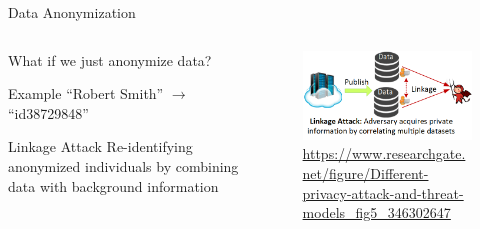 \documentclass[12pt,aspectratio=169]{beamer}
\begin{document}
\begin{frame}{Data Anonymization}

  \begin{columns}[T]
    \begin{column}{.5\textwidth}
What if we just anonymize data?

\vspace{3mm}

\begin{block}{Example}
``Robert Smith'' $\rightarrow$ ``id38729848''
\end{block}

\begin{block}{Linkage Attack}
Re-identifying anonymized individuals by combining data with background information
\end{block}

    \end{column}
    \begin{column}{.5\textwidth}

\begin{figure}
    \centering
    \includegraphics[width=\linewidth]{figures/Different-privacy-attack-and-threat-models.png}
    \caption{\tiny \url{https://www.researchgate.net/figure/Different-privacy-attack-and-threat-models_fig5_346302647}}
\end{figure}

    \end{column}
  \end{columns}

\end{frame}
\end{document}
